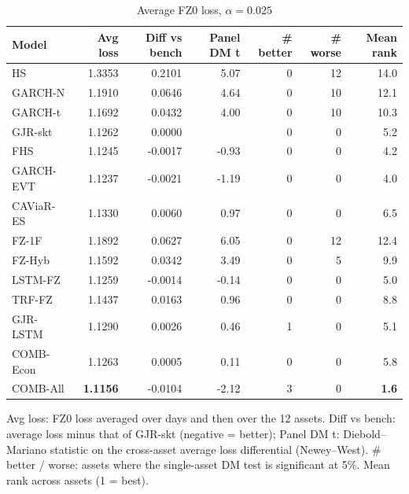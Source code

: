 \begin{table}[htbp]
\centering
\footnotesize
\caption{Average FZ0 loss, $\alpha=0.025$}
\label{tab:loss_a025}
\begin{tabular}{lrrrrrr}
\toprule
Model & Avg loss & Diff vs bench & Panel DM t & \# better & \# worse & Mean rank \\
\midrule
HS & 1.3353 & 0.2101 & 5.07 & 0 & 12 & 14.0 \\
GARCH-N & 1.1910 & 0.0646 & 4.64 & 0 & 10 & 12.1 \\
GARCH-t & 1.1692 & 0.0432 & 4.00 & 0 & 10 & 10.3 \\
GJR-skt & 1.1262 & 0.0000 &  & 0 & 0 & 5.2 \\
FHS & 1.1245 & -0.0017 & -0.93 & 0 & 0 & 4.2 \\
GARCH-EVT & 1.1237 & -0.0021 & -1.19 & 0 & 0 & 4.0 \\
CAViaR-ES & 1.1330 & 0.0060 & 0.97 & 0 & 0 & 6.5 \\
FZ-1F & 1.1892 & 0.0627 & 6.05 & 0 & 12 & 12.4 \\
FZ-Hyb & 1.1592 & 0.0342 & 3.49 & 0 & 5 & 9.9 \\
LSTM-FZ & 1.1259 & -0.0014 & -0.14 & 0 & 0 & 5.0 \\
TRF-FZ & 1.1437 & 0.0163 & 0.96 & 0 & 0 & 8.8 \\
GJR-LSTM & 1.1290 & 0.0026 & 0.46 & 1 & 0 & 5.1 \\
COMB-Econ & 1.1263 & 0.0005 & 0.11 & 0 & 0 & 5.8 \\
COMB-All & \textbf{1.1156} & -0.0104 & -2.12 & 3 & 0 & \textbf{1.6} \\
\bottomrule
\end{tabular}
\par\smallskip\parbox{\linewidth}{\scriptsize Avg loss: FZ0 loss averaged over days and then over the 12 assets. Diff vs bench: average loss minus that of GJR-skt (negative = better); Panel DM t: Diebold--Mariano statistic on the cross-asset average loss differential (Newey--West). \# better / worse: assets where the single-asset DM test is significant at 5\%. Mean rank across assets (1 = best).}
\end{table}